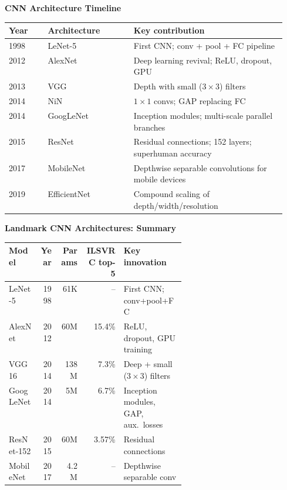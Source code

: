 \documentclass[11pt,a4paper]{article}
\begin{document}
\begin{tcolorbox}[colback=NoteGrayBg,colframe=NoteGray,boxrule=0.8pt,arc=3pt]
\textbf{CNN Architecture Timeline}\\[4pt]
\begin{tabular}{@{}llp{0.55\linewidth}@{}}
\toprule
\textbf{Year} & \textbf{Architecture} & \textbf{Key contribution} \\
\midrule
1998 & LeNet-5       & First CNN; conv + pool + FC pipeline \\
2012 & AlexNet       & Deep learning revival; ReLU, dropout, GPU \\
2013 & VGG           & Depth with small ($3\times3$) filters \\
2014 & NiN           & $1\times1$ convs; GAP replacing FC \\
2014 & GoogLeNet     & Inception modules; multi-scale parallel branches \\
2015 & ResNet        & Residual connections; 152 layers; superhuman accuracy \\
2017 & MobileNet     & Depthwise separable convolutions for mobile devices \\
2019 & EfficientNet  & Compound scaling of depth/width/resolution \\
\bottomrule
\end{tabular}
\end{tcolorbox}

\begin{tcolorbox}[colback=LightBlue,colframe=AccentBlue,boxrule=0.8pt,arc=3pt]
\textbf{Landmark CNN Architectures: Summary}\\[4pt]
\begin{tabular}{@{}lrrrp{0.35\linewidth}@{}}
\toprule
\textbf{Model} & \textbf{Year} & \textbf{Params} & \textbf{ILSVRC top-5} & \textbf{Key innovation} \\
\midrule
LeNet-5     & 1998 & 61K    & -- & First CNN; conv+pool+FC \\
AlexNet     & 2012 & 60M    & 15.4\% & ReLU, dropout, GPU training \\
VGG16       & 2014 & 138M   & 7.3\%  & Deep + small ($3\times3$) filters \\
GoogLeNet   & 2014 & 5M     & 6.7\%  & Inception modules, GAP, aux.\ losses \\
ResNet-152  & 2015 & 60M    & 3.57\% & Residual connections \\
MobileNet   & 2017 & 4.2M   & --     & Depthwise separable conv \\
\bottomrule
\end{tabular}
\end{tcolorbox}
\end{document}
